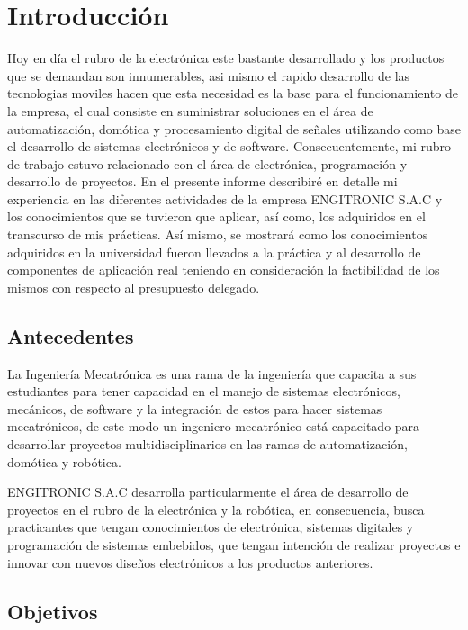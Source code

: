 \chapter{Introducción}

Hoy en día el rubro de la electrónica este bastante desarrollado y los productos que se demandan son innumerables, asi mismo el rapido desarrollo de las tecnologias moviles hacen que esta necesidad es la base para el funcionamiento de la empresa, el cual consiste en suministrar soluciones en el área de automatización, domótica y procesamiento digital de señales utilizando como base el desarrollo de sistemas electrónicos y de software. Consecuentemente, mi rubro de trabajo estuvo relacionado con el área de electrónica, programación y desarrollo de proyectos. En el presente informe describiré en detalle mi experiencia en las diferentes actividades de la empresa ENGITRONIC S.A.C y los conocimientos que se tuvieron que aplicar, así como, los adquiridos en el transcurso de mis prácticas. Así mismo, se mostrará como los conocimientos adquiridos en la universidad fueron llevados a la práctica y al desarrollo de componentes de aplicación real teniendo en consideración la factibilidad de los mismos con respecto al presupuesto delegado.


\section{Antecedentes}
La Ingeniería Mecatrónica es una rama de la ingeniería que capacita a sus estudiantes para tener capacidad en el manejo de sistemas electrónicos, mecánicos, de software y la integración de estos para hacer sistemas mecatrónicos, de este modo un ingeniero mecatrónico está capacitado para desarrollar proyectos multidisciplinarios en las ramas de automatización, domótica y robótica.

ENGITRONIC S.A.C desarrolla particularmente el área de desarrollo de proyectos en el rubro de la electrónica y la robótica, en consecuencia, busca practicantes que tengan conocimientos de electrónica, sistemas digitales y programación de sistemas embebidos, que tengan intención de realizar proyectos e innovar con nuevos diseños electrónicos a los productos anteriores.


\section{Objetivos}

